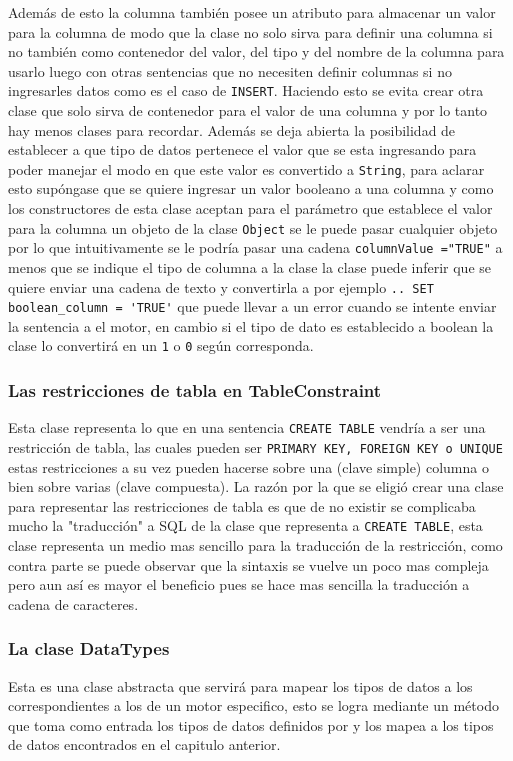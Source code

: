 Además de esto la columna también posee un atributo para almacenar un valor para la columna de modo que la clase no solo sirva para definir una columna si no también como contenedor del valor, del tipo y del nombre  de la columna para usarlo luego con otras sentencias que no necesiten definir columnas si no ingresarles datos como es el caso de \verb=INSERT=. Haciendo esto se evita crear otra clase que solo sirva de contenedor para el valor de una columna y por lo tanto hay menos clases para recordar. Además se deja abierta la posibilidad de establecer a que tipo de datos pertenece el valor que se esta ingresando para poder manejar el modo en que este valor es convertido a \verb=String=, para aclarar esto supóngase que se quiere ingresar un valor booleano a una columna y como los constructores de esta clase aceptan para el parámetro que establece el valor para la columna un objeto de la clase \verb=Object= se le puede pasar cualquier objeto por lo que intuitivamente se le podría pasar una cadena \verb|columnValue ="TRUE"| a menos que se indique el tipo de columna a la clase la clase puede inferir que se quiere enviar una cadena de texto y convertirla a  por ejemplo \verb|.. SET boolean_column = 'TRUE'| que puede llevar a un error cuando se intente enviar la sentencia a el motor, en cambio si el tipo de dato es establecido a boolean la clase lo convertirá en un \verb=1= o \verb=0= según corresponda.
%
\subsubsection{Las restricciones de tabla en TableConstraint}
Esta clase representa lo que en una sentencia \verb=CREATE TABLE= vendría a ser una restricción de tabla, las cuales pueden ser \verb=PRIMARY KEY, FOREIGN KEY o UNIQUE= estas restricciones a su vez pueden hacerse sobre una (clave simple) columna o bien sobre varias (clave compuesta). La razón por la que se eligió crear una clase para representar las restricciones de tabla es que de no existir se complicaba mucho la "traducción" a SQL de la clase que representa a \verb=CREATE TABLE=, esta clase representa un medio mas sencillo para la traducción de la restricción, como contra parte se puede observar que la sintaxis se vuelve un poco mas compleja pero aun así es mayor el beneficio pues se hace mas sencilla la traducción a cadena de caracteres. 
%
\subsubsection{La clase DataTypes}
Esta es una clase abstracta que servirá para mapear los tipos de datos a los correspondientes a los de un motor especifico, esto se logra mediante un método que toma como entrada los tipos de datos definidos por \jd y los mapea a los tipos de datos encontrados en el capitulo anterior.
%
